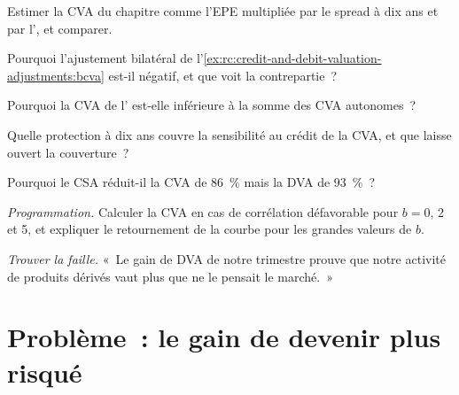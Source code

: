 \begin{exercise}[$\star$]\label{exo:rc:credit-and-debit-valuation-adjustments:2}
Estimer la CVA du chapitre comme l'EPE multipliée par le spread à dix ans et par l', et
comparer.
\end{exercise}

\begin{exercise}[$\star$]\label{exo:rc:credit-and-debit-valuation-adjustments:3}
Pourquoi l'ajustement bilatéral de l'\cref{ex:rc:credit-and-debit-valuation-adjustments:bcva}
est-il négatif, et que voit la contrepartie~?
\end{exercise}

\begin{exercise}[$\star\star$]\label{exo:rc:credit-and-debit-valuation-adjustments:4}
Pourquoi la CVA de l' est-elle inférieure à la somme des CVA autonomes~?
\end{exercise}

\begin{exercise}[$\star\star$]\label{exo:rc:credit-and-debit-valuation-adjustments:5}
Quelle protection à dix ans couvre la sensibilité au crédit de la CVA, et que
laisse ouvert la couverture~?
\end{exercise}

\begin{exercise}[$\star\star$]\label{exo:rc:credit-and-debit-valuation-adjustments:6}
Pourquoi le CSA réduit-il la CVA de 86~\% mais la DVA de 93~\%~?
\end{exercise}

\begin{exercise}[$\star\star\star$]\label{exo:rc:credit-and-debit-valuation-adjustments:7}
\emph{Programmation.} Calculer la CVA en cas de corrélation défavorable pour $b = 0$, 2 et 5, et expliquer le
retournement de la courbe pour les grandes valeurs de $b$.
\end{exercise}

\begin{exercise}[$\star\star\star$]\label{exo:rc:credit-and-debit-valuation-adjustments:8}
\emph{Trouver la faille.} «~Le gain de DVA de notre trimestre prouve que notre activité de produits dérivés vaut
plus que ne le pensait le marché.~»
\end{exercise}

\section{Problème~: le gain de devenir plus risqué}

